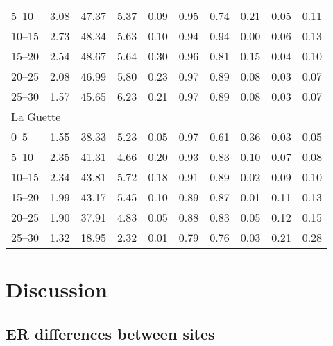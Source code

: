 \begin{table}
\begin{tabular}{llllllllll}
5--10 & 3.08 & 47.37 & 5.37 & 0.09 & 0.95 & 0.74 & 0.21 & 0.05 & 0.11 \\
10--15 & 2.73 & 48.34 & 5.63 & 0.10 & 0.94 & 0.94 & 0.00 & 0.06 & 0.13 \\
15--20 & 2.54 & 48.67 & 5.64 & 0.30 & 0.96 & 0.81 & 0.15 & 0.04 & 0.10 \\
20--25 & 2.08 & 46.99 & 5.80 & 0.23 & 0.97 & 0.89 & 0.08 & 0.03 & 0.07 \\
25--30 & 1.57 & 45.65 & 6.23 & 0.21 & 0.97 & 0.89 & 0.08 & 0.03 & 0.07 \\
\multicolumn{2}{l}{La Guette} & & & & & & & & \\[-.5ex] 
0--5 & 1.55 & 38.33 & 5.23 & 0.05 & 0.97 & 0.61 & 0.36 & 0.03 & 0.05 \\
5--10 & 2.35 & 41.31 & 4.66 & 0.20 & 0.93 & 0.83 & 0.10 & 0.07 & 0.08 \\
10--15 & 2.34 & 43.81 & 5.72 & 0.18 & 0.91 & 0.89 & 0.02 & 0.09 & 0.10 \\
15--20 & 1.99 & 43.17 & 5.45 & 0.10 & 0.89 & 0.87 & 0.01 & 0.11 & 0.13 \\
20--25 & 1.90 & 37.91 & 4.83 & 0.05 & 0.88 & 0.83 & 0.05 & 0.12 & 0.15 \\ 
25--30 & 1.32 & 18.95 & 2.32 & 0.01 & 0.79 & 0.76 & 0.03 & 0.21 & 0.28 \\
\bottomrule
\end{tabular}
\label{table:phychi}
\end{table}

%
\section{Discussion}

\subsection{ER differences between sites}


